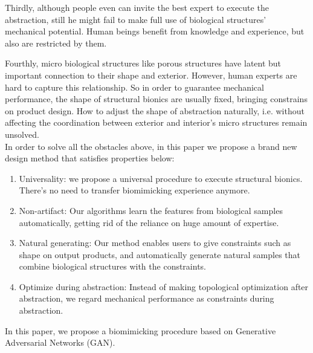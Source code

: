 Thirdly, although people even can invite the best expert to execute the abstraction, still he might fail to make full use of biological structures’ mechanical potential. Human beings benefit from knowledge and experience, but also are restricted by them.

Fourthly, micro biological structures like porous structures have latent but important connection to their shape and exterior. However, human experts are hard to capture this relationship. So in order to guarantee mechanical performance, the shape of structural bionics are usually fixed, bringing constrains on product design. How to adjust the shape of abstraction naturally, i.e. without affecting the coordination between exterior and interior’s micro structures remain unsolved.\\

In order to solve all the obstacles above, in this paper we propose a brand new design method that satisfies properties below: \\
\begin{enumerate}
\item Universality: we propose a universal procedure to execute structural bionics. There’s no need to transfer biomimicking experience anymore.

\item Non-artifact: Our algorithms learn the features from biological samples automatically, getting rid of the reliance on huge amount of expertise. 

\item Natural generating: Our method enables users to give constraints such as shape on output products, and automatically generate natural samples that combine biological structures with the constraints. 

\item Optimize during abstraction: Instead of making topological optimization after abstraction, we regard mechanical performance as constraints during abstraction.\\
\end{enumerate}

In this paper, we propose a biomimicking procedure based on Generative Adversarial Networks (GAN). 


